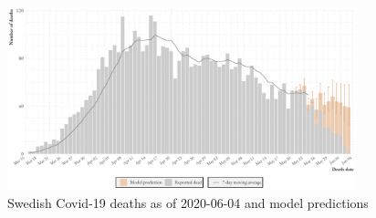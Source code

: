 \begin{figure}[h]
    \centering
    \includegraphics[width=0.9\textwidth]{../plots/latest_prediction}
    \caption{Swedish Covid-19 deaths as of 2020-06-04 and model predictions}
    \label{fig:latest_prediction}
\end{figure}